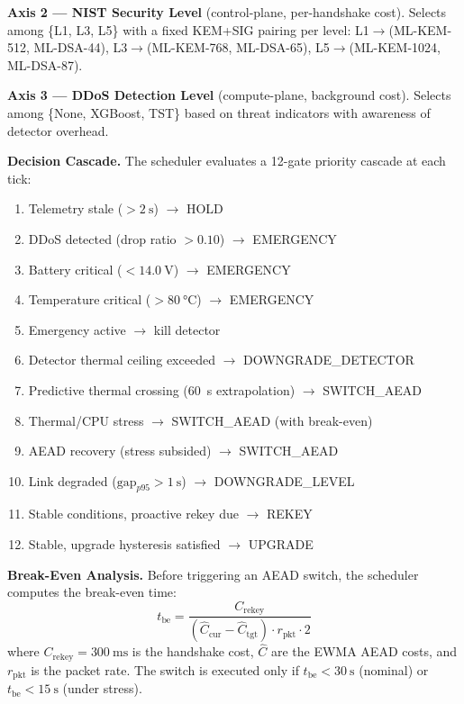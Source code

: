 \documentclass[conference]{IEEEtran}
\begin{document}
\textbf{Axis 2 --- NIST Security Level} (control-plane, per-handshake cost).
Selects among \{L1, L3, L5\} with a fixed KEM+SIG pairing per level: L1$\to$(ML-KEM-512, ML-DSA-44), L3$\to$(ML-KEM-768, ML-DSA-65), L5$\to$(ML-KEM-1024, ML-DSA-87).

\textbf{Axis 3 --- DDoS Detection Level} (compute-plane, background cost).
Selects among \{None, XGBoost, TST\} based on threat indicators with awareness of detector overhead.

\textbf{Decision Cascade.}
The scheduler evaluates a 12-gate priority cascade at each tick:

\begin{enumerate}[noitemsep, label=\arabic*.]
    \item Telemetry stale ($> \SI{2}{\second}$) $\to$ HOLD
    \item DDoS detected (drop ratio $> 0.10$) $\to$ EMERGENCY
    \item Battery critical ($< \SI{14.0}{\volt}$) $\to$ EMERGENCY
    \item Temperature critical ($> \SI{80}{\celsius}$) $\to$ EMERGENCY
    \item Emergency active $\to$ kill detector
    \item Detector thermal ceiling exceeded $\to$ DOWNGRADE\_DETECTOR
    \item Predictive thermal crossing (\SI{60}{\second} extrapolation) $\to$ SWITCH\_AEAD
    \item Thermal/CPU stress $\to$ SWITCH\_AEAD (with break-even)
    \item AEAD recovery (stress subsided) $\to$ SWITCH\_AEAD
    \item Link degraded ($\text{gap}_{p95} > \SI{1}{\second}$) $\to$ DOWNGRADE\_LEVEL
    \item Stable conditions, proactive rekey due $\to$ REKEY
    \item Stable, upgrade hysteresis satisfied $\to$ UPGRADE
\end{enumerate}

\textbf{Break-Even Analysis.}
Before triggering an AEAD switch, the scheduler computes the break-even time:
\begin{equation}
\label{eq:break-even}
    t_{\mathrm{be}} = \frac{C_{\mathrm{rekey}}}{(\hat{C}_{\mathrm{cur}} - \hat{C}_{\mathrm{tgt}}) \cdot r_{\mathrm{pkt}} \cdot 2}
\end{equation}
where $C_{\mathrm{rekey}} = \SI{300}{\milli\second}$ is the handshake cost, $\hat{C}$ are the EWMA AEAD costs, and $r_{\mathrm{pkt}}$ is the packet rate.
The switch is executed only if $t_{\mathrm{be}} < \SI{30}{\second}$ (nominal) or $t_{\mathrm{be}} < \SI{15}{\second}$ (under stress).
\end{document}

